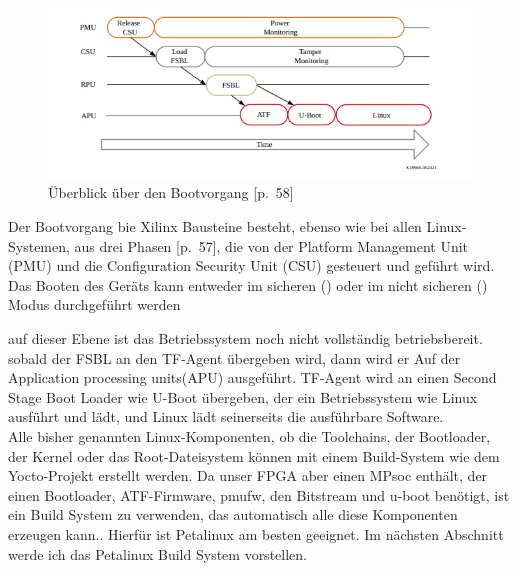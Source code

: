 \begin{figure}[h]
	\begin{center}
		\includegraphics[width=1.1\textwidth]{./images/boot-flow.jpg}
	\end{center}
	\vspace{-5pt}
	\caption[der Bootvorgang bei zynq+MPSoCs]{Überblick über den Bootvorgang \cite{Xilinx2017}[p.~58]} %
	\label{fig:boot:process}
	\vspace{-5pt}
\end{figure}

Der Bootvorgang bie Xilinx Bausteine besteht, ebenso wie bei allen Linux-Systemen, aus drei Phasen \cite{Xilinx2017}[p.~57], die von der Platform Management Unit (PMU) und die Configuration Security Unit (CSU) gesteuert und geführt wird. Das Booten des Geräts kann entweder im sicheren () oder im nicht sicheren () Modus durchgeführt werden 


auf dieser Ebene ist das Betriebssystem noch nicht vollständig betriebsbereit. sobald der FSBL an den TF-Agent übergeben wird, dann wird er Auf der Application processing units(APU) ausgeführt. TF-Agent wird an einen Second Stage Boot Loader wie U-Boot übergeben, der ein Betriebssystem wie Linux ausführt und lädt, und Linux lädt seinerseits die ausführbare Software.\\
Alle bisher genannten Linux-Komponenten, ob die Toolchains, der Bootloader, der Kernel oder das Root-Dateisystem können mit einem Build-System wie dem Yocto-Projekt erstellt werden. Da unser FPGA aber einen MPsoc enthält, der einen Bootloader, ATF-Firmware, pmufw, den Bitstream und u-boot benötigt, ist ein Build System zu verwenden, das automatisch alle diese Komponenten erzeugen kann.. Hierfür ist Petalinux am besten geeignet. Im nächsten Abschnitt werde ich das Petalinux Build System vorstellen. 


